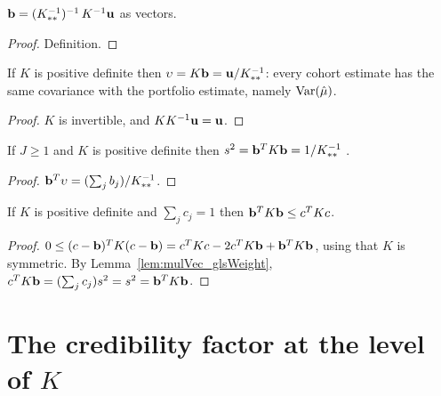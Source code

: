 \begin{lemma}\label{lem:glsWeight_eq_smul}
  \leanok
  $\mathbf{b} = (K^{-1}_{**})^{-1}\, K^{-1}\mathbf{u}$ as vectors.
\end{lemma}
\begin{proof}
  \leanok
  Definition.
\end{proof}

\begin{lemma}[$\upsilon = s^2\bu$]\label{lem:mulVec_glsWeight}
  \leanok
  If $K$ is positive definite then
  $\upsilon = K\mathbf{b} = \mathbf{u} / K^{-1}_{**}$: every cohort estimate has the same
  covariance with the portfolio estimate, namely $\operatorname{Var}(\hat\mu)$.
\end{lemma}
\begin{proof}
  \leanok
  $K$ is invertible, and $K K^{-1}\mathbf{u} = \mathbf{u}$.
\end{proof}

\begin{theorem}\label{thm:glsWeight_value}
  \leanok
  If $J \ge 1$ and $K$ is positive definite then
  $s^2 = \mathbf{b}^T K\mathbf{b} = 1/K^{-1}_{**}$ .
\end{theorem}
\begin{proof}
  \leanok
  $\mathbf{b}^T\upsilon = (\sum_j b_j)/K^{-1}_{**}$.
\end{proof}

\begin{theorem}\label{thm:glsWeight_optimal}
  \leanok
  If $K$ is positive definite and $\sum_j c_j = 1$ then
  $\mathbf{b}^T K\mathbf{b} \le c^T K c$.
\end{theorem}
\begin{proof}
  \leanok
  $0 \le (c - \mathbf{b})^T K (c - \mathbf{b}) = c^TKc - 2c^TK\mathbf{b} + \mathbf{b}^TK\mathbf{b}$, using
  that $K$ is symmetric. By Lemma~\ref{lem:mulVec_glsWeight},
  $c^TK\mathbf{b} = (\sum_j c_j)s^2 = s^2 = \mathbf{b}^TK\mathbf{b}$.
\end{proof}

\section{The credibility factor at the level of $K$}\label{sec:core}

